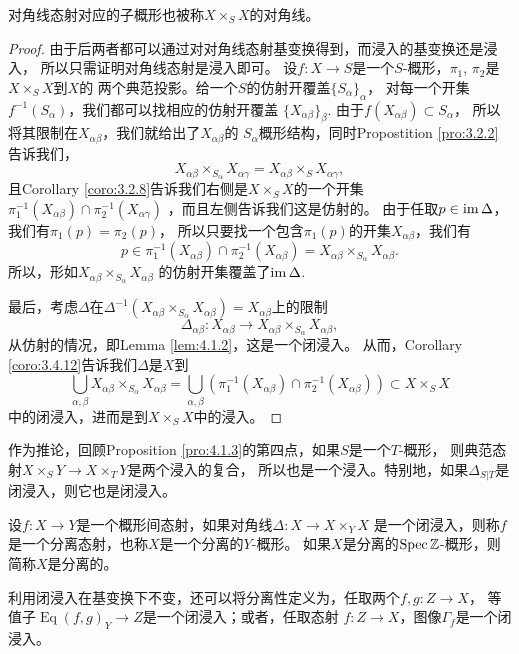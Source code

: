 对角线态射对应的子概形也被称$X\times_S X$的对角线。

\begin{proof}
由于后两者都可以通过对对角线态射基变换得到，而浸入的基变换还是浸入，
所以只需证明对角线态射是浸入即可。
设$f:X\to S$是一个$S$-概形，$\pi_1$, $\pi_2$是$X\times_S X$到$X$的
两个典范投影。给一个$S$的仿射开覆盖$\{S_\alpha\}_\alpha$，
对每一个开集$f^{-1}(S_\alpha)$，我们都可以找相应的仿射开覆盖
$\{X_{\alpha\beta}\}_\beta$. 由于$f(X_{\alpha\beta})\subset S_{\alpha}$，
所以将其限制在$X_{\alpha\beta}$，我们就给出了$X_{\alpha\beta}$的
$S_\alpha$概形结构，同时Propostition \ref{pro:3.2.2}告诉我们，
\[
	X_{\alpha\beta}\times_{S_\alpha}X_{\alpha\gamma}=
	X_{\alpha\beta}\times_{S}X_{\alpha\gamma},
\]
且Corollary \ref{coro:3.2.8}告诉我们右侧是$X\times_S X$的一个开集
$\pi_1^{-1}(X_{\alpha\beta})\cap \pi_2^{-1}(X_{\alpha\gamma})$
，而且左侧告诉我们这是仿射的。
由于任取$p\in \operatorname{im} \Delta$，我们有$\pi_1(p)=\pi_2(p)$，
所以只要找一个包含$\pi_1(p)$的开集$X_{\alpha\beta}$，我们有
\[
p\in \pi_1^{-1}(X_{\alpha\beta})\cap \pi_2^{-1}(X_{\alpha\beta})=
X_{\alpha\beta}\times_{S_\alpha}X_{\alpha\beta}.
\]
所以，形如$X_{\alpha\beta}\times_{S_\alpha}X_{\alpha\beta}$
的仿射开集覆盖了$\operatorname{im} \Delta$. 

最后，考虑$\Delta$在$\Delta^{-1}(X_{\alpha\beta}\times_{S_\alpha}
X_{\alpha\beta})=X_{\alpha\beta}$上的限制
\[
	\Delta_{\alpha\beta}:X_{\alpha\beta}\to X_{\alpha\beta}
	\times_{S_\alpha}X_{\alpha\beta},
\]
从仿射的情况，即Lemma \ref{lem:4.1.2}，这是一个闭浸入。
从而，Corollary \ref{coro:3.4.12}告诉我们$\Delta$是$X$到
\[
\bigcup_{\alpha,\beta}X_{\alpha\beta}\times_{S_\alpha}X_{\alpha\beta}
=\bigcup_{\alpha,\beta}\left(\pi_1^{-1}(X_{\alpha\beta})\cap 
\pi_2^{-1}(X_{\alpha\beta})\right)\subset X\times_S X
\]
中的闭浸入，进而是到$X\times_S X$中的浸入。
\end{proof}

作为推论，回顾Proposition \ref{pro:4.1.3}的第四点，如果$S$是一个$T$-概形，
则典范态射$X\times_S Y\to X\times_T Y$是两个浸入的复合，
所以也是一个浸入。特别地，如果$\Delta_{S|T}$是闭浸入，则它也是闭浸入。

\begin{para}[分离性]
设$f:X\to Y$是一个概形间态射，如果对角线$\Delta:X\to X\times_Y X$
是一个闭浸入，则称$f$是一个分离态射，也称$X$是一个分离的$Y$-概形。
如果$X$是分离的$\operatorname{Spec} \mathbb{Z}$-概形，则简称$X$是分离的。

利用闭浸入在基变换下不变，还可以将分离性定义为，任取两个$f,g:Z\to X$，
等值子$\operatorname{Eq}(f,g)_Y\to Z$是一个闭浸入；或者，任取态射
$f:Z\to X$，图像$\Gamma_f$是一个闭浸入。
\end{para}

